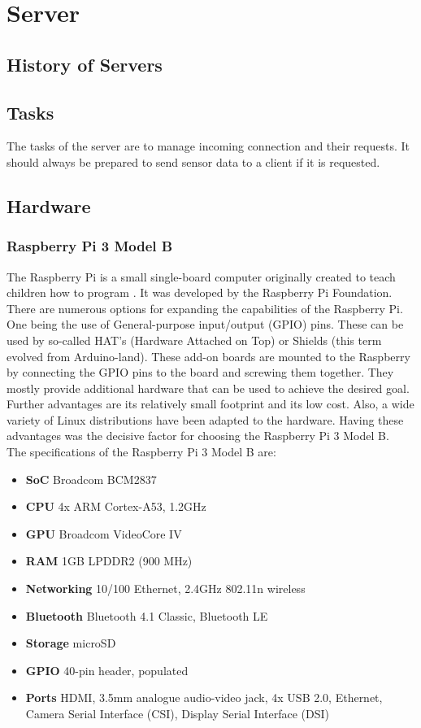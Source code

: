 \chapter{Server}
\label{ch:server}


\section{History of Servers}


\section{Tasks}
The tasks of the server are to manage incoming connection and their requests. It should always be prepared to send sensor data to a client if it is requested.
\section{Hardware}
\subsection{Raspberry Pi 3 Model B}
The Raspberry Pi is a small single-board computer originally created to teach children how to program \cite{RasPi}. It was developed by the Raspberry Pi Foundation. There are numerous options for expanding the capabilities of the Raspberry Pi. One being the use of General-purpose input/output (GPIO) pins. These can be used by so-called HAT's (Hardware Attached on Top) or Shields (this term evolved from Arduino-land). These add-on boards are mounted to the Raspberry by connecting the GPIO pins to the board and screwing them together. They mostly provide additional hardware that can be used to achieve the desired goal. Further advantages are its relatively small footprint and its low cost. Also, a wide variety of Linux distributions have been adapted to the hardware. Having these advantages was the decisive factor for choosing the Raspberry Pi 3 Model B.\\
The specifications of the Raspberry Pi 3 Model B are:

\begin{itemize}
	\item \textbf{SoC} Broadcom BCM2837
	\item \textbf{CPU} 4x ARM Cortex-A53, 1.2GHz
	\item \textbf{GPU} Broadcom VideoCore IV
	\item \textbf{RAM} 1GB LPDDR2 (900 MHz)
	\item \textbf{Networking} 10/100 Ethernet, 2.4GHz 802.11n wireless
	\item \textbf{Bluetooth} Bluetooth 4.1 Classic, Bluetooth LE
	\item \textbf{Storage} microSD
	\item \textbf{GPIO} 40-pin header, populated
	\item \textbf{Ports} HDMI, 3.5mm analogue audio-video jack, 4x USB 2.0, Ethernet, Camera Serial Interface (CSI), Display Serial Interface (DSI)
\end{itemize}


